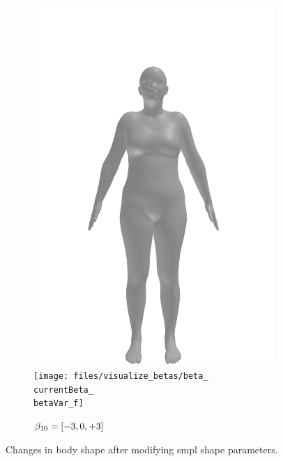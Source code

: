 \begin{figure}[ht!]
\begin{subfigure}{\betaWidth}
        \includegraphics[width=\imgWidth]{files/visualize_betas/baseline_f}
        \texttt{[image: files/visualize\_betas/beta\_\\currentBeta\_\\betaVar\_f]}
        \caption{$\beta_{10} = [-3, 0, +3]$}
    \end{subfigure}
    \caption{Changes in body shape after modifying \gls{smpl} shape parameters.}\label{fig:beta-vis}
\end{figure}